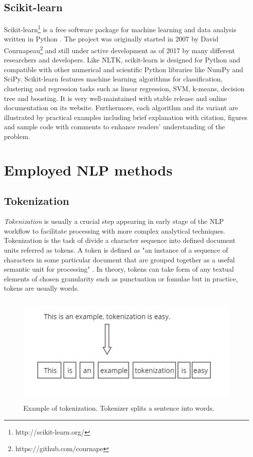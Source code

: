 \subsection{Scikit-learn}
Scikit-learn\footnote{http://scikit-learn.org/} is a free software package for machine learning and data analysis written in Python \cite{scikit-learn}. The project was originally started in 2007 by David Cournapeau\footnote{https://github.com/cournape} and still under active development as of 2017 by many different researchers and developers. Like NLTK, scikit-learn is designed for Python and compatible with other numerical and scientific Python libraries like NumPy and SciPy. Scikit-learn features machine learning algorithms for classification, clustering and regression tasks such as linear regression, SVM, k-means, decision tree and boosting. It is very well-maintained with stable release and online documentation on its website. Furthermore, each algorithm and its variant are illustrated by practical examples including brief explanation with citation, figures and sample code with comments to enhance readers' understanding of the problem. 


\section{Employed NLP methods}
\subsection{Tokenization}
\textit{Tokenization} is usually a crucial step appearing in early stage of the NLP workflow to facilitate processing with more complex analytical techniques. Tokenization is the task of divide a character sequence into defined document units referred as tokens. A token is defined as "an instance of a sequence of characters in some particular document that are grouped together as a useful semantic unit for processing" \cite{Manning:2008:IIR:1394399}. In theory, tokens can take form of any textual elements of chosen granularity such as punctuation or fomulae but in practice, tokens are usually words.\\

\begin{figure}
\centering
\includegraphics[width=\textwidth, clip=true, height = 5.5cm]{img/tokenization_example}
\caption[Tokenization example]{ Example of tokenization. Tokenizer splits a sentence into words.} 
\label{fig:token_ex1}
\end{figure}

